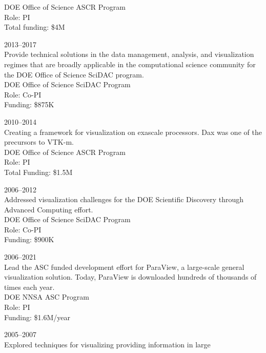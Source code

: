 \documentclass{article}
\begin{document}
\begin{description}
  DOE Office of Science ASCR Program\\
  Role: PI\\
  Total funding: \$4M
\item[SciDAC Scalable Data Analysis and Visualization Institute]\hfill 2013--2017\\
  Provide technical solutions in the data management, analysis, and
  visualization regimes that are broadly applicable in the
  computational science community for the DOE Office of Science SciDAC program.\\
  DOE Office of Science SciDAC Program\\
  Role: Co-PI\\
  Funding: \$875K
\item[Data Analysis at Extreme (Dax)]\hfill 2010--2014\\
  Creating a framework for visualization on exascale processors. Dax was one of the precursors to \mbox{VTK-m}.\\
  DOE Office of Science ASCR Program\\
  Role: PI\\
  Total Funding: \$1.5M
\item[SciDAC Institute for Ultrascale Visualization]\hfill 2006--2012\\
  Addressed visualization challenges for the DOE Scientific Discovery through Advanced Computing effort.\\
  DOE Office of Science SciDAC Program\\
  Role: Co-PI\\
  Funding: \$900K
\item[ParaView Development Lead]\hfill 2006--2021\\
  Lead the ASC funded development effort for ParaView, a large-scale
  general visualization solution. Today, ParaView is downloaded hundreds of thousands of times each year.\\
  DOE NNSA ASC Program\\
  Role: PI\\
  Funding: \$1.6M/year %
\item[Massive Graph Visualization]\hfill 2005--2007 \\
  Explored techniques for visualizing providing information in large

\end{description}
\end{document}
